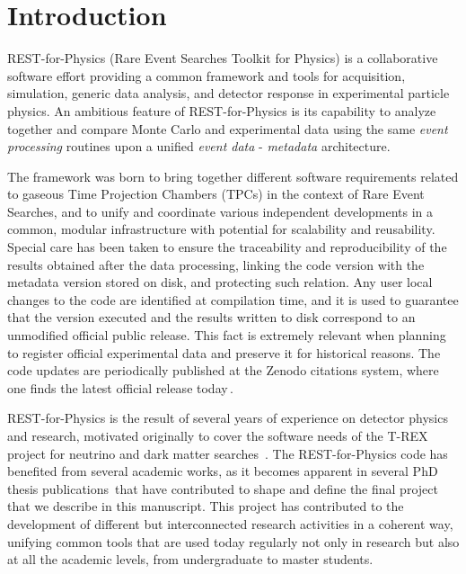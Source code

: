 \section{Introduction}
\label{sec:intro}

REST-for-Physics (Rare Event Searches Toolkit for Physics) is a collaborative software effort providing a common framework and tools for acquisition, simulation, generic data analysis, and detector response in experimental particle physics. An ambitious feature of REST-for-Physics is its capability to analyze together and compare Monte Carlo and experimental data using the same \emph{event processing} routines upon a unified \emph{event data} - \emph{metadata} architecture. 

The framework was born to bring together different software requirements related to gaseous Time Projection Chambers (TPCs) in the context of Rare Event Searches, and to unify and coordinate various independent developments in a common, modular infrastructure with potential for scalability and reusability. Special care has been taken to ensure the traceability and reproducibility of the results obtained after the data processing, linking the code version with the metadata version stored on disk, and protecting such relation. Any user local changes to the code are identified at compilation time, and it is used to guarantee that the version executed and the results written to disk correspond to an unmodified official public release. This fact is extremely relevant when planning to register official experimental data and preserve it for historical reasons. The code updates are periodically published at the Zenodo citations system, where one finds the latest official release today\,\cite{javier_galan_2021_5092550}.

REST-for-Physics is the result of several years of experience on detector physics and research, motivated originally to cover the software needs of the T-REX project for neutrino and dark matter searches~\cite{Irastorza:2015dcb,Irastorza:2015geo}. The REST-for-Physics code has benefited from several academic works, as it becomes apparent in several PhD thesis publications\,\cite{IguazThesis,tomas2013development,SeguiThesis,HerreraThesis,GraciaThesis, GarciaPascualThesis, RuizThesis} that have contributed to shape and define the final project that we describe in this manuscript.
This project has contributed to the development of different but interconnected research activities in a coherent way, unifying common tools that are used today regularly not only in research but also at all the academic levels, from undergraduate to master students. 

